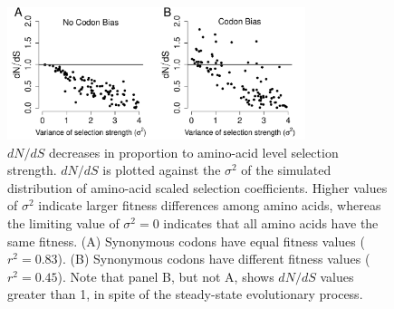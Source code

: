 \documentclass[11pt]{article}
\begin{document}
\begin{figure}[htbp]
	\centerline{\includegraphics[width=8.7cm]{figures/MainText/dnds_variance.pdf}}
	\caption{\label{dnds_variance} $dN/dS$ decreases in proportion to amino-acid level selection strength. $dN/dS$ is plotted against the $\sigma^2 $ of the simulated distribution of amino-acid scaled selection coefficients. Higher values of $\sigma^2$ indicate larger fitness differences among amino acids, whereas the limiting value of $\sigma^2 = 0$ indicates that all amino acids have the same fitness. (A) Synonymous codons have equal fitness values ($r^2=0.83$). (B) Synonymous codons have different fitness values ($r^2=0.45$). Note that panel B, but not A, shows $dN/dS$ values greater than 1, in spite of the steady-state evolutionary process.}
\end{figure}
		
		
\vspace{2cm}
		
\end{document}
